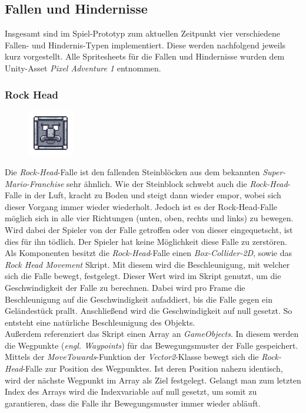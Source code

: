 \subsection{Fallen und Hindernisse}
Insgesamt sind im Spiel-Prototyp zum aktuellen Zeitpunkt vier verschiedene Fallen- und Hindernis-Typen implementiert. Diese werden nachfolgend jeweils kurz vorgestellt. Alle Spritesheets für die Fallen und Hindernisse wurden dem Unity-Asset \textit{Pixel Adventure 1} entnommen.

\subsubsection*{Rock Head}

\begin{figure}[H]
\includegraphics[width=20mm]{Figures/rock_head_idle.png}
\label{fig:Plant}
\end{figure}

Die \textit{Rock-Head}-Falle ist den fallenden Steinblöcken aus dem bekannten \textit{Super-Mario-Franchise} sehr ähnlich. Wie der Steinblock schwebt auch die \textit{Rock-Head}-Falle in der Luft, kracht zu Boden und steigt dann wieder empor, wobei sich dieser Vorgang immer wieder wiederholt. Jedoch ist es der Rock-Head-Falle möglich sich in alle vier Richtungen (unten, oben, rechts und links) zu bewegen. Wird dabei der Spieler von der Falle getroffen oder von dieser eingequetscht, ist dies für ihn tödlich. Der Spieler hat keine Möglichkeit diese Falle zu zerstören.\\

Als Komponenten besitzt die \textit{Rock-Head}-Falle einen \textit{Box-Collider-2D}, sowie das \textit{Rock Head Movement} Skript. Mit diesem wird die Beschleunigung, mit welcher sich die Falle bewegt, festgelegt. Dieser Wert wird im Skript genutzt, um die Geschwindigkeit der Falle zu berechnen. Dabei wird pro Frame die Beschleunigung auf die Geschwindigkeit aufaddiert, bis die Falle gegen ein Geländestück prallt. Anschließend wird die Geschwindigkeit auf null gesetzt. So entsteht eine natürliche Beschleunigung des Objekts.\\

Außerdem referenziert das Skript einen Array an \textit{GameObjects}. In diesem werden die Wegpunkte (\textit{engl. Waypoints}) für das Bewegungsmuster der Falle gespeichert. Mittels der \textit{MoveTowards}-Funktion der \textit{Vector2}-Klasse bewegt sich die \textit{Rock-Head}-Falle zur Position des Wegpunktes. Ist deren Position nahezu identisch, wird der nächste Wegpunkt im Array als Ziel festgelegt. Gelangt man zum letzten Index des Arrays wird die Indexvariable auf null gesetzt, um somit zu garantieren, dass die Falle ihr Bewegungsmuster immer wieder abläuft.\\


